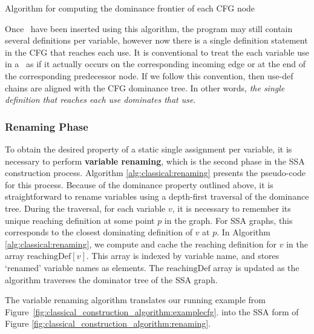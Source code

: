 \begin{algorithm}
\caption{\label{alg:classical_construction:df}Algorithm for computing the dominance frontier of each CFG node}
\end{algorithm}



Once \phiops\ have been inserted using this algorithm, the program may
still contain several definitions per variable, however now there is a
single definition statement 
in the CFG that reaches each use. 
It is conventional to treat the each variable use in a \phiop\
as if it actually occurs on the corresponding incoming edge or at the end of the
corresponding predecessor node.
If we follow this convention,  
then use-def chains are aligned with the CFG dominance tree.
In other words,
\emph{the single definition that reaches each use dominates that use}.

\subsubsection*{Renaming Phase}

To obtain the desired property of a static single assignment per variable,
it is necessary to perform \textbf{variable renaming}, which
is the second phase in the SSA construction process.
Algorithm \ref{alg:classical:renaming} presents the pseudo-code
for this process.
Because of the dominance property outlined above,
it is straightforward to rename variables
using a depth-first traversal of the dominance tree.
During the traversal, for each variable $v$, it is necessary to
remember its unique reaching definition at some point $p$ in the graph. 
For SSA graphs, this corresponds to the closest dominating definition
of $v$ at $p$.
In Algorithm \ref{alg:classical:renaming}, we compute and cache the 
reaching definition for $v$ in the array $\mathrm{reachingDef}[v]$.
This array is indexed by variable name, and stores 
`renamed' variable names as elements. 
The
$\mathrm{reachingDef}$ array is updated as the algorithm traverses
the dominator tree of the SSA graph.

The variable renaming algorithm translates our running example 
from Figure~\ref{fig:classical_construction_algorithm:examplecfg}.
into the SSA form of Figure
\ref{fig:classical_construction_algorithm:renaming}.



